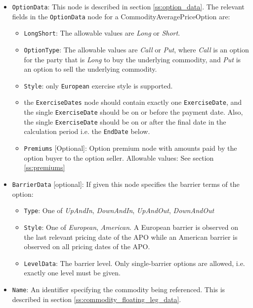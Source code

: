 \begin{itemize}

\item \lstinline!OptionData!: This node is described in section \ref{ss:option_data}. The relevant fields in the \lstinline!OptionData! node for a  CommodityAveragePriceOption are:
\begin{itemize}
  \item \lstinline!LongShort!: The allowable values are \emph{Long} or \emph{Short}.
  \item \lstinline!OptionType!: The allowable values are \emph{Call} or \emph{Put}, where \emph{Call} is an option for the party that is  \emph{Long} to buy the underlying commodity, and \emph{Put} is an option to sell the underlying commodity.
  \item  \lstinline!Style!:  only \lstinline!European! exercise style is supported.
  \item the \lstinline!ExerciseDates! node should contain exactly one \lstinline!ExerciseDate!, and  the single \lstinline!ExerciseDate! should be on or before the payment date. Also,  the single \lstinline!ExerciseDate! should be on or after the final date in the calculation period i.e. the \lstinline!EndDate! below.
  \item \lstinline!Premiums! [Optional]: Option premium node with amounts paid by the option buyer to the option seller.
Allowable values:  See section \ref{ss:premiums}
\end{itemize}

\item \lstinline!BarrierData! [optional]: If given this node specifies the barrier terms of the option:

\begin{itemize}
    \item \lstinline!Type!: One of \emph{UpAndIn}, \emph{DownAndIn}, \emph{UpAndOut}, \emph{DownAndOut}
    \item \lstinline!Style!: One of \emph{European}, \emph{American}. A European barrier is observed on the last relevant pricing date of the APO while an American barrier is observed on all pricing dates of the APO.
    \item \lstinline!LevelData!: The barrier level. Only single-barrier options are allowed, i.e. exactly one level must be given.
\end{itemize}

\item \lstinline!Name!: An identifier specifying the commodity being referenced. This is described in section \ref{ss:commodity_floating_leg_data}. 


\end{itemize}
